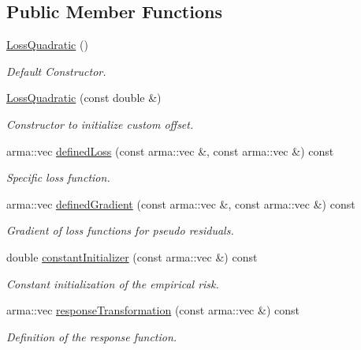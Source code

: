 \subsection*{Public Member Functions}
\begin{DoxyCompactItemize}
\item 
\hyperlink{classloss_1_1_loss_quadratic_ae1bc457d09db2e808cf7f4f80f92730a}{Loss\+Quadratic} ()
\begin{DoxyCompactList}\small\item\em Default Constructor. \end{DoxyCompactList}\item 
\hyperlink{classloss_1_1_loss_quadratic_af3ac6ec45217231e7a0829c8501ccf1b}{Loss\+Quadratic} (const double \&)
\begin{DoxyCompactList}\small\item\em Constructor to initialize custom offset. \end{DoxyCompactList}\item 
arma\+::vec \hyperlink{classloss_1_1_loss_quadratic_a7495a0d225ae5470840e8f377419d7cf}{defined\+Loss} (const arma\+::vec \&, const arma\+::vec \&) const
\begin{DoxyCompactList}\small\item\em Specific loss function. \end{DoxyCompactList}\item 
arma\+::vec \hyperlink{classloss_1_1_loss_quadratic_ad8b03123e260e2f034e507fff9695604}{defined\+Gradient} (const arma\+::vec \&, const arma\+::vec \&) const
\begin{DoxyCompactList}\small\item\em Gradient of loss functions for pseudo residuals. \end{DoxyCompactList}\item 
double \hyperlink{classloss_1_1_loss_quadratic_a8519141a797078485d04038ad44a4592}{constant\+Initializer} (const arma\+::vec \&) const
\begin{DoxyCompactList}\small\item\em Constant initialization of the empirical risk. \end{DoxyCompactList}\item 
arma\+::vec \hyperlink{classloss_1_1_loss_quadratic_a2534e3ec615acd6d0c80c2dbcfb8c1e9}{response\+Transformation} (const arma\+::vec \&) const
\begin{DoxyCompactList}\small\item\em Definition of the response function. \end{DoxyCompactList}\end{DoxyCompactItemize}
